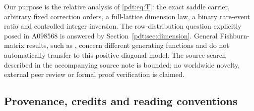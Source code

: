 Our purpose is the relative analysis of \eqref{pdt:eq:T}: the exact saddle carrier, arbitrary fixed correction orders, a full-lattice dimension law, a binary rare-event ratio and controlled integer inversion. The row-distribution question explicitly posed in A098568 is answered by Section~\ref{pdt:sec:dimension}. General Fishburn-matrix results, such as \cite{hj}, concern different generating functions and do not automatically transfer to this positive-diagonal model. The source search described in the accompanying source note is bounded; no worldwide novelty, external peer review or formal proof verification is claimed.

\subsection{Provenance, credits and reading conventions}\label{pdt:sec:provenance}
